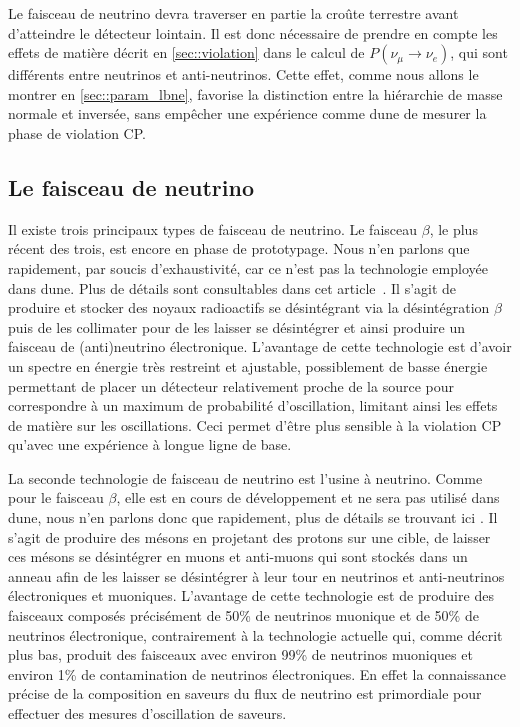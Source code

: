             Le faisceau de neutrino devra traverser en partie la croûte terrestre avant d'atteindre le détecteur lointain. Il est donc nécessaire de prendre en compte les effets de matière décrit en \autoref{sec::violation} dans le calcul de $P(\nu_{\mu}\to \nu_e)$, qui sont différents entre neutrinos et anti-neutrinos. Cette effet, comme nous allons le montrer en \autoref{sec::param_lbne}, favorise la distinction entre la hiérarchie de masse normale et inversée, sans empêcher une expérience comme \gls{dune} de mesurer la phase de violation CP.
            
        \subsection{Le faisceau de neutrino}\label{sec::faisceau}
        
            Il existe trois principaux types de faisceau de neutrino. Le faisceau $\beta$, le plus récent des trois, est encore en phase de prototypage. Nous n'en parlons que rapidement, par soucis d'exhaustivité, car ce n'est pas la technologie employée dans \gls{dune}. Plus de détails sont consultables dans cet article~\cite{Wildner2012}. Il s'agit de produire et stocker des noyaux radioactifs se désintégrant via la désintégration $\beta$ puis de les collimater pour de les laisser se désintégrer et ainsi produire un faisceau de (anti)neutrino électronique. L'avantage de cette technologie est d'avoir un spectre en énergie très restreint et ajustable, possiblement de basse énergie permettant de placer un détecteur relativement proche de la source pour correspondre à un maximum de probabilité d'oscillation, limitant ainsi les effets de matière sur les oscillations. Ceci permet d'être plus sensible à la violation CP qu'avec une expérience à longue ligne de base.
            
            La seconde technologie de faisceau de neutrino est l'usine à neutrino. Comme pour le faisceau $\beta$, elle est en cours de développement et ne sera pas utilisé dans \gls{dune}, nous n'en parlons donc que rapidement, plus de détails se trouvant ici \cite{Bogomilov2014}. Il s'agit de produire des mésons en projetant des protons sur une cible, de laisser ces mésons se désintégrer en muons et anti-muons qui sont stockés dans un anneau afin de les laisser se désintégrer à leur tour en neutrinos et anti-neutrinos électroniques et muoniques. L'avantage de cette technologie est de produire des faisceaux composés précisément de 50\% de neutrinos muonique et de 50\% de neutrinos électronique, contrairement à la technologie actuelle qui, comme décrit plus bas, produit des faisceaux avec environ 99\% de neutrinos muoniques et environ 1\% de contamination de neutrinos électroniques. En effet la connaissance précise de la composition en saveurs du flux de neutrino est primordiale pour effectuer des mesures d'oscillation de saveurs.
            
